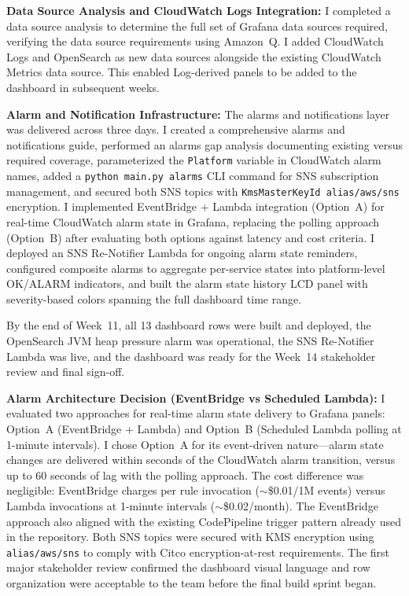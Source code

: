 \textbf{Data Source Analysis and CloudWatch Logs Integration:} 
I completed a data source analysis to determine the full set of
Grafana data sources required, verifying the data source requirements using Amazon~Q.
I added CloudWatch Logs and OpenSearch as new data sources alongside
the existing CloudWatch Metrics data source. This enabled Log-derived
panels to be added to the dashboard in subsequent weeks.

\textbf{Alarm and Notification Infrastructure:} 
The
alarms and notifications layer was delivered across three days.
I created a comprehensive alarms and notifications guide,
performed an alarms gap analysis documenting existing versus required
coverage, parameterized the \texttt{Platform} variable in CloudWatch
alarm names, added a \texttt{python main.py alarms} CLI command for
SNS subscription management, and secured both SNS topics with
\texttt{KmsMasterKeyId alias/aws/sns} encryption. I
implemented EventBridge + Lambda integration (Option~A) for real-time
CloudWatch alarm state in Grafana, replacing the polling approach (Option~B) after
evaluating both options against latency and cost criteria.
I deployed an SNS Re-Notifier Lambda for ongoing alarm
state reminders, configured composite alarms to aggregate
per-service states into platform-level OK/ALARM indicators, and built the
alarm state history LCD panel with severity-based colors
spanning the full dashboard time range.

By the end of Week~11, all 13 dashboard rows were built and deployed,
the OpenSearch JVM heap pressure alarm was operational, the SNS
Re-Notifier Lambda was live, and the dashboard was ready for the
Week~14 stakeholder review and final sign-off.

\textbf{Alarm Architecture Decision (EventBridge vs Scheduled Lambda):} 
I evaluated two approaches for real-time alarm state delivery
to Grafana panels: Option~A (EventBridge + Lambda) and Option~B
(Scheduled Lambda polling at 1-minute intervals). I chose Option~A
for its event-driven nature---alarm state changes are delivered within
seconds of the CloudWatch alarm transition, versus up to 60 seconds of
lag with the polling approach. The cost difference was negligible:
EventBridge charges per rule invocation ($\sim$\$0.01/1M events) versus
Lambda invocations at 1-minute intervals ($\sim$\$0.02/month). The
EventBridge approach also aligned with the existing CodePipeline trigger
pattern already used in the repository. Both SNS topics were secured
with KMS encryption using \texttt{alias/aws/sns} to comply with Citco
encryption-at-rest requirements. The first major stakeholder
review confirmed the dashboard visual language and row organization were
acceptable to the team before the final build sprint began.

